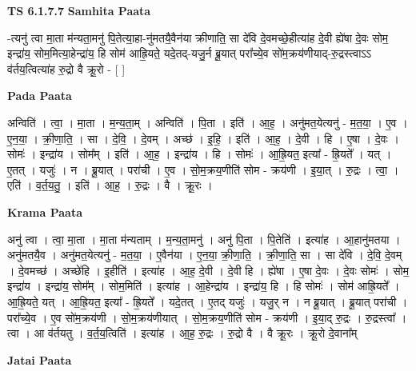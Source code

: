 \documentclass[17pt]{extarticle}
\begin{document}
\textbf{TS 6.1.7.7 } \newline
\textbf{Samhita Paata} \newline

-त्यनु॑ त्वा मा॒ता म॑न्यता॒मनु॑ पि॒तेत्या॒हा-नु॑मतयै॒वैन॑या क्रीणाति॒ सा दे॑वि दे॒वमच्छे॒हीत्या॑ह दे॒वी ह्ये॑षा दे॒वः सोम॒ इन्द्रा॑य॒ सोम॒मित्या॒हेन्द्रा॑य॒ हि सोम॑ आह्रि॒यते॒ यदे॒तद्-यजु॒र्न ब्रू॒यात् परा᳚च्ये॒व सो॑म॒क्रय॑णीयाद्-रु॒द्रस्त्वाऽऽ व॑र्तय॒त्वित्या॑ह रु॒द्रो वै क्रू॒रो - [  ] \newline

\textbf{Pada Paata} \newline

अन्विति॑ । त्वा॒ । मा॒ता । म॒न्य॒ता॒म् । अन्विति॑ । पि॒ता । इति॑ । आ॒ह॒ । अनु॑मत॒येत्यनु॑ - म॒त॒या॒ । ए॒व । ए॒न॒या॒ । क्री॒णा॒ति॒ । सा । दे॒वि॒ । दे॒वम् । अच्छ॑ । इ॒हि॒ । इति॑ । आ॒ह॒ । दे॒वी । हि । ए॒षा । दे॒वः । सोमः॑ । इन्द्रा॑य । सोम᳚म् । इति॑ । आ॒ह॒ । इन्द्रा॑य । हि । सोमः॑ । आ॒ह्रि॒यत॒ इत्या᳚ - ह्रि॒यते᳚ । यत् । ए॒तत् । यजुः॑ । न । ब्रू॒यात् । परा॑ची । ए॒व । सो॒म॒क्रय॒णीति॑ सोम - क्रय॑णी । इ॒या॒त् । रु॒द्रः । त्वा॒ । एति॑ । व॒र्त॒य॒तु॒ । इति॑ । आ॒ह॒ । रु॒द्रः । वै । क्रू॒रः ।  \newline


\textbf{Krama Paata} \newline

अनु॑ त्वा । त्वा॒ मा॒ता । मा॒ता म॑न्यताम् । म॒न्य॒ता॒मनु॑ । अनु॑ पि॒ता । पि॒तेति॑ । इत्या॑ह । आ॒हानु॑मतया । अनु॑मतयै॒व । अनु॑मत॒येत्यनु॑ - म॒त॒या॒ । ए॒वैन॑या । ए॒न॒या॒ क्री॒णा॒ति॒ । क्री॒णा॒ति॒ सा । सा दे॑वि । दे॒वि॒ दे॒वम् । दे॒वमच्छ॑ । अच्छे॑हि । इ॒हीति॑ । इत्या॑ह । आ॒ह॒ दे॒वी । दे॒वी हि । ह्ये॑षा । ए॒षा दे॒वः । दे॒वः सोमः॑ । सोम॒ इन्द्रा॑य । इन्द्रा॑य॒ सोम᳚म् । सोम॒मिति॑ । इत्या॑ह । आ॒हेन्द्रा॑य । इन्द्रा॑य॒ हि । हि सोमः॑ । सोम॑ आह्रि॒यते᳚ । आ॒ह्रि॒यते॒ यत् । आ॒ह्रि॒यत॒ इत्या᳚ - ह्रि॒यते᳚ । यदे॒तत् । ए॒तद् यजुः॑ । यजु॒र् न । न ब्रू॒यात् । ब्रू॒यात् परा॑ची । परा᳚च्ये॒व । ए॒व सो॑म॒क्रय॑णी । सो॒म॒क्रय॑णीयात् । सो॒म॒क्रय॒णीति॑ सोम - क्रय॑णी । इ॒या॒द् रु॒द्रः । रु॒द्रस्त्वा᳚ । त्वा । आ व॑र्तयतु । व॒र्त॒य॒त्विति॑ । इत्या॑ह । आ॒ह॒ रु॒द्रः । रु॒द्रो वै । वै क्रू॒रः । क्रू॒रो दे॒वाना᳚म् \newline

\textbf{Jatai Paata} \newline
\end{document}
